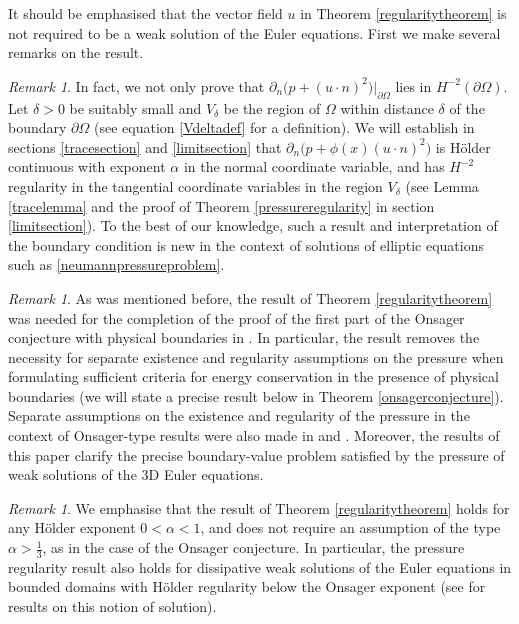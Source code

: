 \documentclass[12pt,a4paper]{article}
\theoremstyle{definition}
\theoremstyle{remark}
\newtheorem{remark}[theorem]{Remark}
\numberwithin{equation}{section}
\begin{document}
It should be emphasised that the vector field $u$ in Theorem \ref{regularitytheorem} is not required to be a weak solution of the Euler equations. First we make several remarks on the result. 
\begin{remark}
In fact, we not only prove that $\partial_n \big(p + (u \cdot n)^2 \big) \lvert_{\partial \Omega}$ lies in $H^{-2} (\partial \Omega)$. Let $\delta > 0$ be suitably small and $V_\delta$ be the region of $\Omega$ within distance $\delta$ of the boundary $\partial \Omega$ (see equation \eqref{Vdeltadef} for a definition). We will establish in sections \ref{tracesection} and \ref{limitsection} that $\partial_n \big(p + \phi (x) (u \cdot n)^2 \big)$ is Hölder continuous with exponent $\alpha$ in the normal coordinate variable, and has $H^{-2}$ regularity in the tangential coordinate variables in the region $V_\delta$ (see Lemma \ref{tracelemma} and the proof of Theorem \ref{pressureregularity} in section \ref{limitsection}). To the best of our knowledge, such a result and interpretation of the boundary condition is new in the context of solutions of elliptic equations such as \eqref{neumannpressureproblem}.
\end{remark}
\begin{remark}
As was mentioned before, the result of Theorem \ref{regularitytheorem} was needed for the completion of the proof of the first part of the Onsager conjecture with physical boundaries in \cite[~Proposition 1.2]{titi2018}. In particular, the result removes the necessity for separate existence and regularity assumptions on the pressure when formulating sufficient criteria for energy conservation in the presence of physical boundaries (we will state a precise result below in Theorem \ref{onsagerconjecture}). Separate assumptions on the existence and regularity of the pressure in the context of Onsager-type results were also made in \cite[~Theorem 4.1]{titi2019} and \cite[~Theorem 1 and Remark 3]{drivas2018}. Moreover, the results of this paper clarify the precise boundary-value problem satisfied by the pressure of weak solutions of the 3D Euler equations.
\end{remark}
\begin{remark}
We emphasise that the result of Theorem \ref{regularitytheorem} holds for any Hölder exponent $0 < \alpha < 1$, and does not require an assumption of the type $\alpha > \frac{1}{3}$, as in the case of the Onsager conjecture. In particular, the pressure regularity result also holds for dissipative weak solutions of the Euler equations in bounded domains with Hölder regularity below the Onsager exponent (see \cite{bardoseuler,bardosturbulence} for results on this notion of solution). 
\end{remark}
\end{document}
